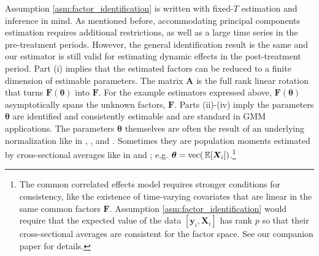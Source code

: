 \documentclass[12pt]{article}
\begin{document}
Assumption \ref{asm:factor_identification} is written with fixed-$T$ estimation and inference in mind. As mentioned before, accommodating principal components estimation requires additional restrictions, as well as a large time series in the pre-treatment periods. However, the general identification result is the same and our estimator is still valid for estimating dynamic effects in the post-treatment period. Part (i) implies that the estimated factors can be reduced to a finite dimension of estimable parameters. The matrix $\bm A$ is the full rank linear rotation that turns $\bm{F}(\bm{\theta})$ into $\bm{F}$. For the example estimators expressed above, $\bm{F}(\bm{\theta})$ asymptotically spans the unknown factors, $\bm{F}$. Parts (ii)-(iv) imply the parameters $\bm{\theta}$ are identified and consistently estimable and are standard in GMM applications. The parameters $\bm{\theta}$ themselves are often the result of an underlying normalization like in \citet{Ahn_Lee_Schmidt_2001,Ahn_Lee_Schmidt_2013}, \citet{Juodis_Sarafidis_2022,Juodis_Sarafidis2021}, and \citet{Callaway_Karami_2020}. Sometimes they are population moments estimated by cross-sectional averages like in \citet{Westerlund_Petrova_Norkute_2019} and \citet{Brown_Schmidt_Wooldridge2021}; e.g. $\bm \theta = \text{vec}(\expec{\bm X_i})$.\footnote{The common correlated effects model requires stronger conditions for consistency, like the existence of time-varying covariates that are linear in the same common factors $\bm F$. Assumption \ref{asm:factor_identification} would require that the expected value of the data $[\bm y_i, \bm X_i]$ has rank $p$ so that their cross-sectional averages are consistent for the factor space. See our companion paper \citet{Brown_Butts_Westerlund_2023} for details.}

\end{document}
